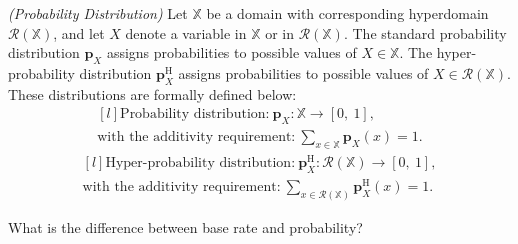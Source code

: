 \begin{definition}
	\emph{(Probability Distribution)} Let $\mathbb{X}$ be a domain with corresponding
hyperdomain $\mathcal{R}(\mathbb{X})$, and let $X$ denote a variable in $\mathbb{X}$ or in $\mathcal{R}(\mathbb{X})$. The standard probability distribution $\mathbf{p}_X$ assigns probabilities to possible values of $X \in \mathbb{X}$. The hyper-probability distribution $\mathbf{p}_X^\mathrm{H}$ assigns probabilities to possible values of $X \in \mathcal{R}(\mathbb{X})$. These distributions are formally defined below:
	\begin{equation}
		\begin{matrix*}[l]
			\text{Probability distribution:}\ \mathbf{p}_X : \mathbb{X} \rightarrow [0,\ 1], \\
			\text{with the additivity requirement:}\ \sum_{x \in \mathbb{X}} \mathbf{p}_X(x) = 1\text{.}
		\end{matrix*}
	\end{equation}
	\begin{equation}
		\begin{matrix*}[l]
			\text{Hyper-probability distribution:}\ \mathbf{p}_X^\mathrm{H} : \mathcal{R}(\mathbb{X}) \rightarrow [0,\ 1], \\
			\text{with the additivity requirement:}\ \sum_{x \in \mathcal{R}(\mathbb{X})} \mathbf{p}_X^\mathrm{H}(x) = 1\text{.}
		\end{matrix*}
	\end{equation}
\end{definition}

\begin{question}
	What is the difference between base rate and probability?
\end{question}
